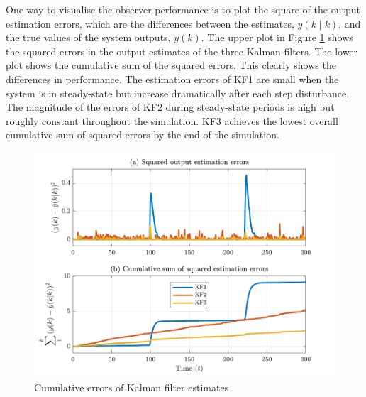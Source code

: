 One way to visualise the observer performance is to plot the square of the output estimation errors, which are the differences between the estimates, $\hat{y}(k \mid k)$, and the true values of the system outputs, $y(k)$. The upper plot in Figure \ref{fig:sim-sys-siso-KF123-cumerr} shows the squared errors in the output estimates of the three Kalman filters. The lower plot shows the cumulative sum of the squared errors. This clearly shows the differences in performance. The estimation errors of KF1 are small when the system is in steady-state but increase dramatically after each step disturbance. The magnitude of the errors of KF2 during steady-state periods is high but roughly constant throughout the simulation. KF3 achieves the lowest overall cumulative sum-of-squared-errors by the end of the simulation.
\begin{figure}[htp]
	\centering
	\includegraphics[width=13cm]{images/rod_obs_sim1_all_seed_cum_err_y1_KF123.pdf}
	\caption{Cumulative errors of Kalman filter estimates}
	\label{fig:sim-sys-siso-KF123-cumerr}
\end{figure}

